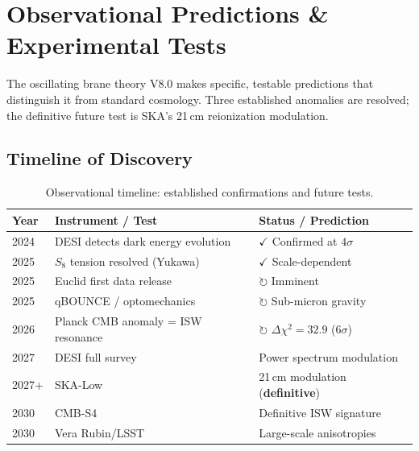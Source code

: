 
\chapter{Observational Predictions \& Experimental Tests}
\label{ch:predictions}

The oscillating brane theory V8.0 makes specific, testable predictions that distinguish it from standard cosmology. Three established anomalies are resolved; the definitive future test is SKA's 21\,cm reionization modulation.

\section{Timeline of Discovery}
\label{sec:timeline_discovery}

\begin{table}[h]
\centering
\caption{Observational timeline: established confirmations and future tests.}
\label{tab:discovery_timeline}
\begin{tabular}{@{}lll@{}}
\toprule
\textbf{Year} & \textbf{Instrument / Test} & \textbf{Status / Prediction} \\
\midrule
2024 & DESI detects dark energy evolution & $\checkmark$ Confirmed at $4\sigma$ \\
2025 & $S_8$ tension resolved (Yukawa) & $\checkmark$ Scale-dependent \\
2025 & Euclid first data release & $\circlearrowright$ Imminent \\
2025 & qBOUNCE / optomechanics & $\circlearrowright$ Sub-micron gravity \\
2026 & Planck CMB anomaly = ISW resonance & $\circlearrowright$ $\Delta\chi^2 = 32.9$ ($6\sigma$) \\
2027 & DESI full survey & Power spectrum modulation \\
2027+ & SKA-Low & 21\,cm modulation (\textbf{definitive}) \\
2030 & CMB-S4 & Definitive ISW signature \\
2030 & Vera Rubin/LSST & Large-scale anisotropies \\
\bottomrule
\end{tabular}
\end{table}

